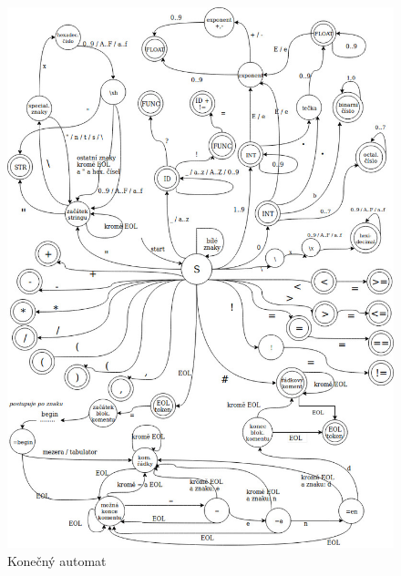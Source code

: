 \documentclass[11pt, a4paper]{article}
\begin{document}
\begin{figure}[ht]
\begin{center}
\includegraphics[scale=0.58]{KA.jpg}
\caption{Konečný automat}
\label{pic:1}
\end{center}
\end{figure}
\end{document}

